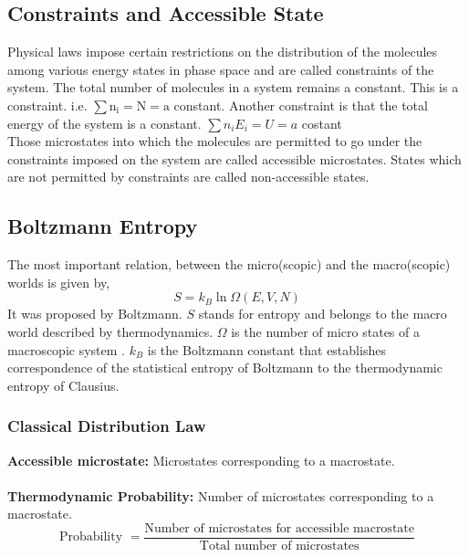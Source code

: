 \subsection{Constraints and Accessible State}
Physical laws impose certain restrictions on the distribution of the molecules among various energy states in phase space and are called constraints of the system. The total number of molecules in a system remains a constant. This is a constraint. i.e. $\sum \mathrm{n}_{\mathrm{i}}=\mathrm{N}=\mathrm{a}$ constant. Another constraint is that the total energy of the system is a constant. $\sum n_{i} E_{i}=U=a$ costant\\
 Those microstates into which the molecules are permitted to go under the constraints imposed on the system are called accessible microstates. States which are not permitted by constraints are called non-accessible states.
 \subsection{Boltzmann Entropy}
 The most important relation, between the micro(scopic) and the macro(scopic) worlds is given by,
\begin{equation}
 S=k_{B} \ln {\Omega}(E, V, N)
\end{equation}
 It was proposed by Boltzmann. $ S$ stands for entropy and belongs to the macro world described by thermodynamics. ${\Omega}$ is the number of micro states of a macroscopic system . $ k_{B}$ is the Boltzmann constant  that establishes correspondence of the statistical entropy of Boltzmann to the thermodynamic entropy of Clausius.
 \subsubsection{ Classical Distribution Law }
 \textbf{Accessible microstate\qquad \quad : } Microstates corresponding to a macrostate.\\\\
 \textbf{Thermodynamic Probability: } Number of microstates corresponding to a macrostate.
 \begin{equation}
 \text{Probability }=\frac{\text{Number of microstates for accessible macrostate}}{\text{Total number of microstates}}
 \end{equation}

